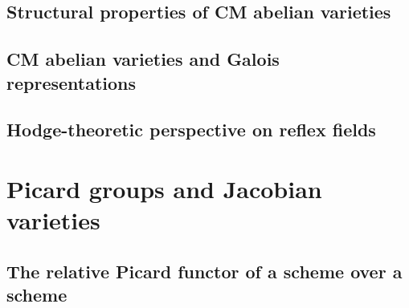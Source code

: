 \subsection{Structural properties of CM abelian varieties}




\subsection{CM abelian varieties and Galois representations}




\subsection{Hodge-theoretic perspective on reflex fields}





\section{Picard groups and Jacobian varieties}





\subsection{The relative Picard functor of a scheme over a scheme}





